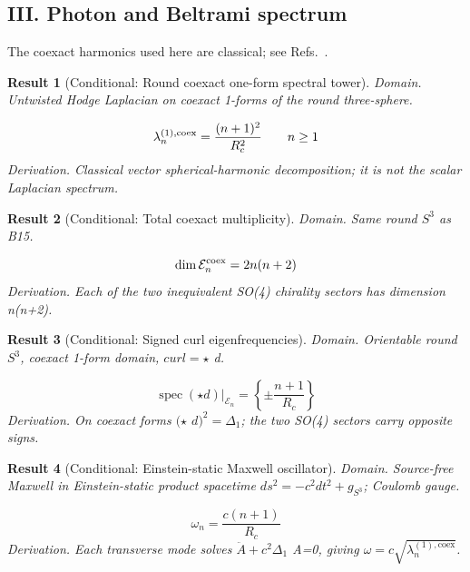 \documentclass[aps,prd,onecolumn,notitlepage,groupedaddress,11pt]{revtex4-2}
\newtheorem{result}{Result}
\begin{document}
\subsection{III. Photon and Beltrami spectrum}\noindent The coexact harmonics used here are classical; see Refs.~\cite{VectorS3,CurlOpt}.\par
\begin{result}[\textsf{Conditional}: Round coexact one-form spectral tower]\label{bridge:15}
\textit{Domain.} Untwisted Hodge Laplacian on coexact 1-forms of the round three-sphere.\par
\begin{equation}\label{bridgeeq:15}
\lambda^{(1),\rm coex}_n=\frac{(n+1)^2}{R_c^2}\qquad n\ge1
\end{equation}
\textit{Derivation.} Classical vector spherical-harmonic decomposition; it is not the scalar Laplacian spectrum.
\end{result}
\begin{result}[\textsf{Conditional}: Total coexact multiplicity]\label{bridge:16}
\textit{Domain.} Same round \(S^3\) as B15.\par
\begin{equation}\label{bridgeeq:16}
\dim\mathcal E^{\rm coex}_n=2n(n+2)
\end{equation}
\textit{Derivation.} Each of the two inequivalent SO(4) chirality sectors has dimension n(n+2).
\end{result}
\begin{result}[\textsf{Conditional}: Signed curl eigenfrequencies]\label{bridge:17}
\textit{Domain.} Orientable round \(S^3\), coexact 1-form domain, \(curl=\star\) d.\par
\begin{equation}\label{bridgeeq:17}
\operatorname{spec}(\star d)|_{\mathcal E_n}=\left\{\pm\frac{n+1}{R_c}\right\}
\end{equation}
\textit{Derivation.} On coexact forms \((\star\) \(d)^2=\Delta_1\); the two SO(4) sectors carry opposite signs.
\end{result}
\begin{result}[\textsf{Conditional}: Einstein-static Maxwell oscillator]\label{bridge:18}
\textit{Domain.} Source-free Maxwell in Einstein-static product spacetime \(ds^2=-c^2dt^2+g_{S^3}\); Coulomb gauge.\par
\begin{equation}\label{bridgeeq:18}
\omega_n=\frac{c(n+1)}{R_c}
\end{equation}
\textit{Derivation.} Each transverse mode solves \(\ddot{A}+c^2\Delta_1\) A=0, giving \(\omega=c\sqrt{\lambda^{(1),\mathrm{coex}}_n}\).
\end{result}
\end{document}
